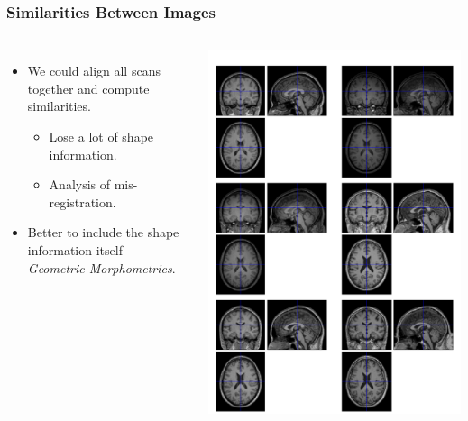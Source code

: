 \documentclass{beamer}
\begin{document}
\begin{frame}
\frametitle{Similarities Between Images}
\begin{columns}[c]
\begin{itemize}
\item{We could align all scans together and compute similarities.
\begin{itemize}
\item{Lose a lot of shape information.}
\item{Analysis of mis-registration.}
\end{itemize}
}
\item{Better to include the shape information itself - \emph{Geometric Morphometrics}.}
\end{itemize}
\includegraphics[width=\textwidth]{warped_images}
\end{columns}
\end{frame}
\end{document}
